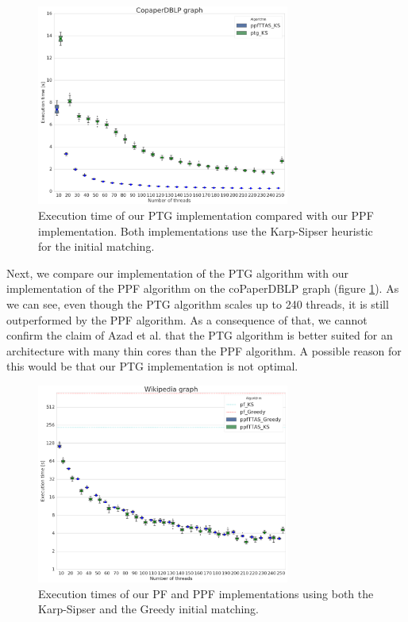 \documentclass[letterpaper]{article}
\begin{document}
\begin{figure}\centering
	\includegraphics[width=8.3cm]{../../plot/output/report/coPaperDBLP_TGvsPPFTTAS.png}
	\caption{Execution time of our PTG implementation compared with our PPF implementation. Both implementations use the Karp-Sipser heuristic for the initial matching.}
	\label{fig:tgvsppf}
\end{figure}

Next, we compare our implementation of the PTG algorithm with our implementation of the PPF algorithm on the coPaperDBLP graph (figure \ref{fig:tgvsppf}). As we can see, even though the PTG algorithm scales up to 240 threads, it is still outperformed by the PPF algorithm. As a consequence of that, we cannot confirm the claim of Azad et al. that the PTG algorithm is better suited for an architecture with many thin cores than the PPF algorithm. A possible reason for this would be that our PTG implementation is not optimal.\\

\begin{figure}\centering
	\includegraphics[width=8.3cm]{../../plot/output/report/wikipedia_PFvsPPFTTAS.png}
	\caption{Execution times of our PF and PPF implementations using both the Karp-Sipser and the Greedy initial matching.}
	\label{fig:ksvsgreedy}
\end{figure}
\end{document}
